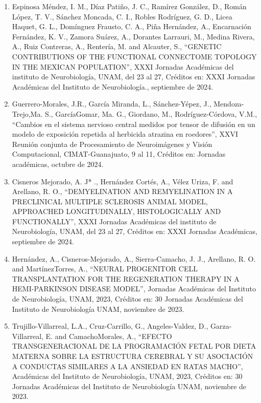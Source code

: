 \begin{enumerate}
\item Espinosa Méndez, I. M., Díaz Patiño, J. C., Ramírez González, D., Román López, T. V., Sánchez Moncada, C. I., Robles Rodríguez, G. D., 
Licea 
Haquet, G. L., Domínguez Frausto, C. A., Piña Hernández, A., Encarnación Fernández, K. V., Zamora Suárez, A., Dorantes Larrauri, M., Medina 
Rivera, A., Ruiz Contreras, A., Rentería, M. and Alcauter, S., “GENETIC CONTRIBUTIONS OF THE FUNCTIONAL CONNECTOME TOPOLOGY IN THE MEXICAN 
POPULATION”, XXXI Jornadas Académicas del instituto de Neurobiología, UNAM, del 23 al 27, Créditos en: XXXI Jornadas Académicas del Instituto 
de Neurobiología., septiembre de 2024.

\item Guerrero-Morales, J.R., García Miranda, L., Sánchez-Yépez, J., Mendoza-Trejo,Ma. S., GarcíaGomar, Ma. G., Giordano, M., 
Rodríguez-Córdova, 
V.M., “Cambios en el sistema nervioso central medidos por tensor de difusión en un modelo de exposición repetida al herbicida atrazina en 
roedores”, XXVI Reunión conjunta de Procesamiento de Neuroimágenes y Visión Computacional, CIMAT-Guanajuato, 9 al 11, Créditos en: Jornadas 
académicas, octubre de 2024.

\item Cisneros Mejorado, A. J* ., Hernández Cortés, A., Vélez Uriza, F. and Arellano, R. O., “DEMYELINATION AND REMYELINATION IN A 
PRECLINICAL 
MULTIPLE SCLEROSIS ANIMAL MODEL, APPROACHED LONGITUDINALLY, HISTOLOGICALLY AND FUNCTIONALLY”, XXXI Jornadas Académicas del instituto de 
Neurobiología, UNAM, del 23 al 27, Créditos en: XXXI Jornadas Académicas, septiembre de 2024.

\item Hernández, A., Cisneros-Mejorado, A., Sierra-Camacho, J. J., Arellano, R. O. and MartínezTorres, A., “NEURAL PROGENITOR CELL 
TRANSPLANTATION 
FOR THE REGENERATION THERAPY IN A HEMI-PARKINSON DISEASE MODEL”, Jornadas Académicas del Instituto de Neurobiología, UNAM, 2023, Créditos en: 
30 Jornadas Académicas del Instituto de Neurobiología UNAM, noviembre de 2023.

\item Trujillo-Villarreal, L.A., Cruz-Carrillo, G., Angeles-Valdez, D., Garza-Villarreal, E. and CamachoMorales, A., “EFECTO 
TRANSGENERACIONAL DE 
LA PROGRAMACIÓN FETAL POR DIETA MATERNA SOBRE LA ESTRUCTURA CEREBRAL Y SU ASOCIACIÓN A CONDUCTAS SIMILARES A LA ANSIEDAD EN RATAS MACHO”, 
Académicas del Instituto de Neurobiología, UNAM, 2023, Créditos en: 30 Jornadas Académicas del Instituto de Neurobiología UNAM, noviembre de 
2023.


\end{enumerate}
